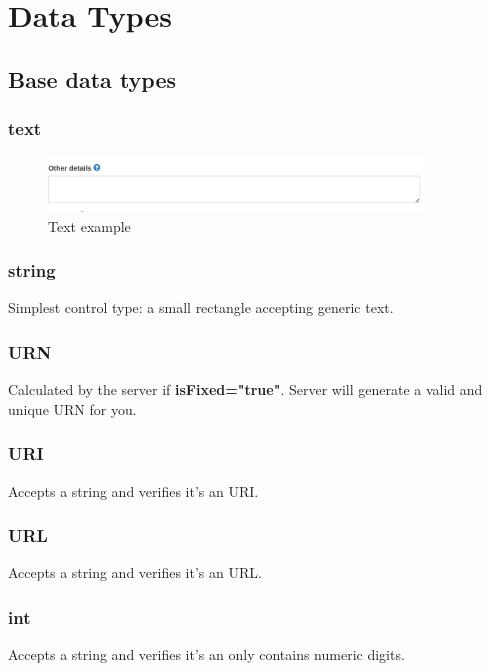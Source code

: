 \documentclass[10pt]{article}
\begin{document}
\section{Data Types} 
\label{datatypes}

\subsection{Base data types}
\label{base-types}

\subsubsection{text}
\label{text}

\begin{figure}[h]
	\caption{Text example}
	\includegraphics[width=10cm]{Textarea.png}
	\centering
\end{figure}

\subsubsection{string}
\label{string}

Simplest control type: a small rectangle accepting generic text.

\subsubsection{URN}
\label{URN}

Calculated by the server if \textbf{isFixed="true"}.
Server will generate a valid and unique URN for you.

\subsubsection{URI}
\label{URI}

Accepts a string and verifies it's an URI.

\subsubsection{URL}
\label{URL}
Accepts a string and verifies it's an URL.

\subsubsection{int}
\label{int}
Accepts a string and verifies it's an only contains numeric digits.
\end{document}
